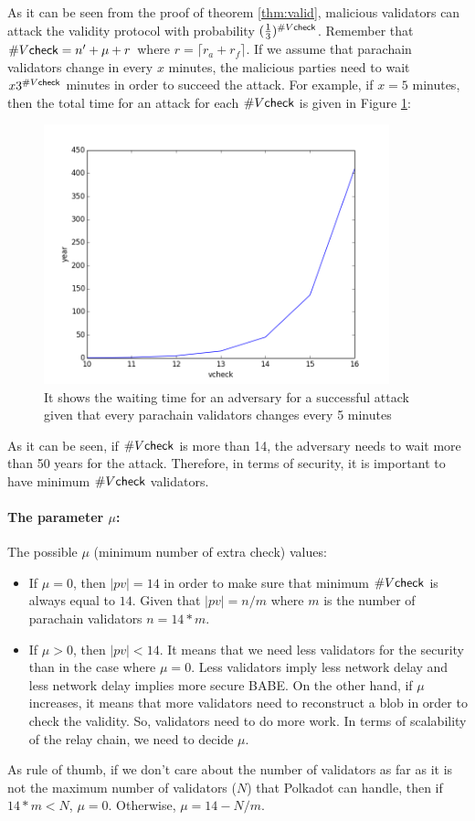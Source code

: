 As it can be seen from the proof of theorem \ref{thm:valid}, malicious validators can attack the validity protocol with probability $(\frac{1}{3})^{\#V\mathsf{check}}$. Remember that $\#V\mathsf{check} = n' + \mu + r$ where $r = \lceil r_a + r_f \rceil$. If we assume that parachain validators change in every $x$ minutes, the malicious parties need to wait $x3^{\#V\mathsf{check}}$ minutes in order to succeed the attack. For example, if $x = 5$ minutes, then the total time for an attack for each $\#V\mathsf{check}$ is given in Figure \ref{fig:totaltime}:


\begin{figure}[h]\centering
	  \includegraphics[width=10cm]{images/year.png}
	  \caption{It shows the waiting time for an adversary for a successful attack given that every parachain validators changes every 5 minutes}
	  \label{fig:totaltime}
\end{figure}

As it can be seen,  if $\#V\mathsf{check}$ is more than 14, the adversary needs to wait more than 50 years for the attack. Therefore, in terms of security, it is important to have  minimum $\#V\mathsf{check}$ validators.

\paragraph{The parameter $\mu$:} The possible $\mu$ (minimum number of extra check) values:

\begin{itemize}
    \item If $\mu = 0$, then $|pv| = 14$ in order to make sure that minimum $\#V\mathsf{check}$ is always equal to $14$. Given that $|pv| = n/m$ where $m$ is the number of parachain validators $n = 14 * m$. 
    
    \item If $\mu > 0$, then $|pv| < 14$. It means that we need less validators for the security than in the case where $\mu = 0$. Less validators imply less network delay and less network delay implies more secure BABE. On the other hand, if $\mu$ increases, it means that more validators need to reconstruct a blob in order to check the validity. So, validators need to do more work. In terms of scalability of the relay chain, we need to decide $\mu$. 
\end{itemize}
As rule of thumb, if we don't care about the number of validators as far as it is not the maximum  number of validators ($N$) that Polkadot can handle, then if $14 * m < N$, $\mu = 0$. Otherwise, $\mu = 14 -N/m$. 

